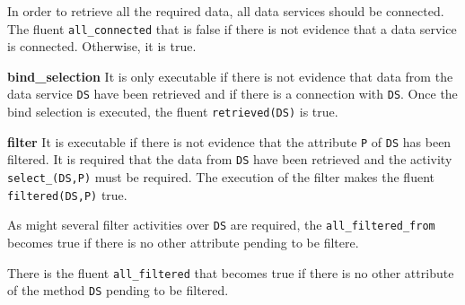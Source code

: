 
\vspace*{0.25cm}
In order to retrieve all the required data, all data services should be connected. The fluent \texttt{all_connected} that is false if there is not evidence that a data service is connected. Otherwise, it is true.

%


\vspace*{0.25cm}
\textbf{bind_selection} It is only executable if there is not evidence that data from the data service \texttt{DS} have been retrieved and if there is a connection with \texttt{DS}. Once the bind selection is executed, the fluent \texttt{retrieved(DS)} is true. 

      
%


\vspace*{0.25cm}
\textbf{filter} It is executable if there is not evidence that the attribute \texttt{P} of \texttt{DS} has been filtered. It is required that the data from \texttt{DS} have been retrieved and the activity \texttt{select_(DS,P)} must be required. The execution of the filter makes the fluent \texttt{filtered(DS,P)} true.

%


\vspace*{0.25cm}
As might several filter activities over \texttt{DS} are required, the \texttt{all_filtered_from} becomes true if there is no other attribute pending to be filtere.

%


\vspace*{0.25cm}
There is the fluent \texttt{all\_filtered} that becomes true if there is no other attribute of the method \texttt{DS} pending to be filtered.

